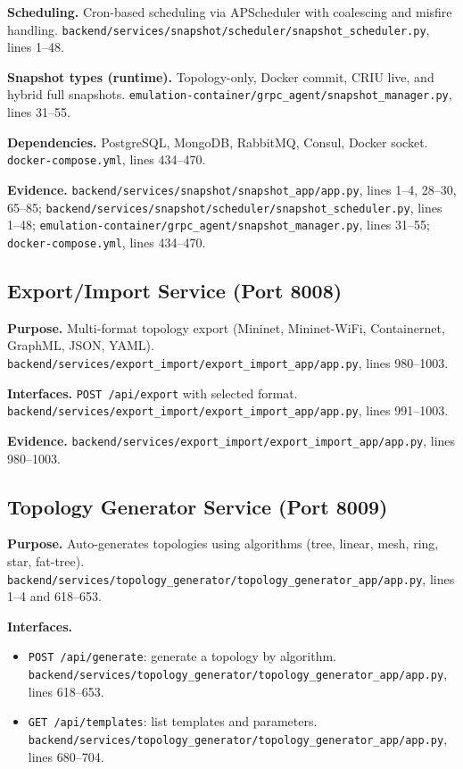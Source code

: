 \documentclass[conference]{IEEEtran}
\begin{document}
\textbf{Scheduling.} Cron-based scheduling via APScheduler with coalescing and misfire handling. \texttt{backend/services/snapshot/scheduler/snapshot\_scheduler.py}, lines 1--48.

\textbf{Snapshot types (runtime).} Topology-only, Docker commit, CRIU live, and hybrid full snapshots. \texttt{emulation-container/grpc\_agent/snapshot\_manager.py}, lines 31--55.

\textbf{Dependencies.} PostgreSQL, MongoDB, RabbitMQ, Consul, Docker socket. \texttt{docker-compose.yml}, lines 434--470.

\textbf{Evidence.} \texttt{backend/services/snapshot/snapshot\_app/app.py}, lines 1--4, 28--30, 65--85; \texttt{backend/services/snapshot/scheduler/snapshot\_scheduler.py}, lines 1--48; \texttt{emulation-container/grpc\_agent/snapshot\_manager.py}, lines 31--55; \texttt{docker-compose.yml}, lines 434--470.

\subsection{Export/Import Service (Port 8008)}
\textbf{Purpose.} Multi-format topology export (Mininet, Mininet-WiFi, Containernet, GraphML, JSON, YAML). \texttt{backend/services/export\_import/export\_import\_app/app.py}, lines 980--1003.

\textbf{Interfaces.} \texttt{POST /api/export} with selected format. \texttt{backend/services/export\_import/export\_import\_app/app.py}, lines 991--1003.

\textbf{Evidence.} \texttt{backend/services/export\_import/export\_import\_app/app.py}, lines 980--1003.

\subsection{Topology Generator Service (Port 8009)}
\textbf{Purpose.} Auto-generates topologies using algorithms (tree, linear, mesh, ring, star, fat-tree). \texttt{backend/services/topology\_generator/topology\_generator\_app/app.py}, lines 1--4 and 618--653.

\textbf{Interfaces.}
\begin{itemize}
\item \texttt{POST /api/generate}: generate a topology by algorithm. \texttt{backend/services/topology\_generator/topology\_generator\_app/app.py}, lines 618--653.
\item \texttt{GET /api/templates}: list templates and parameters. \texttt{backend/services/topology\_generator/topology\_generator\_app/app.py}, lines 680--704.
\end{itemize}
\end{document}

